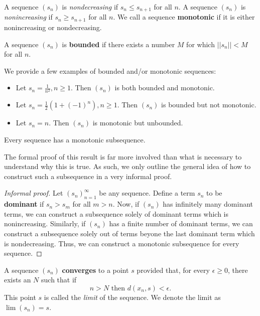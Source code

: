 \begin{defn}
A sequence $(s_n)$  is \textit{nondecreasing} if $s_n \leq s_{n+1}$ for all $n$.  A sequence $(s_n)$  is \textit{nonincreasing} if $s_n \geq s_{n+1}$ for all $n$.  We call a sequence \textbf{monotonic} if it is either nonincreasing or nondecreasing.
\end{defn}

\begin{defn}
A sequence $(s_n)$ is \textbf{bounded} if there exists a number $M$ for which $||s_n|| < M$ for all $n$.
\end{defn}

\begin{example}
We provide a few examples of bounded and/or monotonic sequences:
\begin{itemize}
\item Let $s_n = \frac{1}{n^2}, n\geq 1$.  Then $(s_n)$ is both bounded and monotonic.
\item Let $s_n = \frac{1}{2}(1 + (-1)^n), n \geq 1$.  Then $(s_n)$ is bounded but not monotonic.
\item Let $s_n = n$.  Then $(s_n)$ is monotonic but unbounded.
\end{itemize}
\end{example}

\begin{theorem}
Every sequence has a monotonic subsequence.
\end{theorem}

The formal proof of this result is far more involved than what is necessary to understand why this is true.  As such, we only outline the general idea of how to construct such a subsequence in a very informal proof.

\begin{proof}[Informal proof]
Let $(s_n)_{n=1}^\infty$ be any sequence.  Define a term $s_n$ to be \textbf{dominant} if $s_n > s_m$ for all $m>n$.  Now, if $(s_n)$ has infinitely many dominant terms, we can construct a subsequence solely of dominant terms which is nonincreasing.  Similarly, if $(s_n)$ has a finite number of dominant terms, we can construct a subsequence solely out of terms beyone the last dominant term which is nondecreasing.  Thus, we can construct a monotonic subsequence for every sequence.
\end{proof}

\begin{defn}
A sequence $(s_n)$ \textbf{converges} to a point $s$ provided that, for every $\epsilon \geq 0$, there exists an $N$ such that if
\[n > N \textrm{ then } d(x_n, s) < \epsilon.\]
This point $s$ is called the \textit{limit} of the sequence.  We denote the limit as $\lim(s_n) = s$.
\end{defn}

